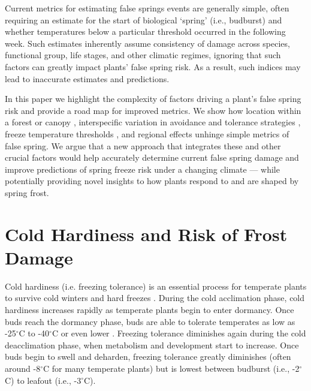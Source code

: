 \documentclass{article}\usepackage[]{graphicx}\usepackage[]{color}
\begin{document}
Current metrics for estimating false springs events are generally simple, often requiring an estimate for the start of biological `spring' (i.e., budburst) and whether temperatures below a particular threshold occurred in the following week. Such estimates inherently assume consistency of damage across species, functional group, life stages, and other climatic regimes, ignoring that such factors can greatly impact plants' false spring risk. As a result, such indices may lead to inaccurate estimates and predictions. %

In this paper we highlight the complexity of factors driving a plant's false spring risk and provide a road map for improved metrics. We show how location within a forest or canopy \citep{Augspurger2013}, interspecific variation in avoidance and tolerance strategies \citep{Martin2010, Muffler2016}, freeze temperature thresholds \citep{Lenz2013}, and regional effects \citep{Muffler2016} unhinge simple metrics of false spring. We argue that a new approach that integrates these and other crucial factors would help accurately determine current false spring damage and improve predictions of spring freeze risk under a changing climate --- while potentially providing novel insights to how plants respond to and are shaped by spring frost. %


\section*{Cold Hardiness and Risk of Frost Damage} %
Cold hardiness (i.e. freezing tolerance) is an essential process for temperate plants to survive cold winters and hard freezes \citep{Vitasse2014}. During the cold acclimation phase, cold hardiness increases rapidly as temperate plants begin to enter dormancy. Once buds reach the dormancy phase, buds are able to tolerate temperates as low as -25$^{\circ}$C to -40$^{\circ}$C or even lower \citep{Charrier2011,Vitasse2014}. Freezing tolerance diminishes again during the cold deacclimation phase, when metabolism and development start to increase. Once buds begin to swell and deharden, freezing tolerance greatly diminishes (often around -8$^{\circ}$C for many temperate plants) but is lowest between budburst (i.e., -2$^{\circ}$C) to leafout (i.e., -3$^{\circ}$C).
\end{document}
